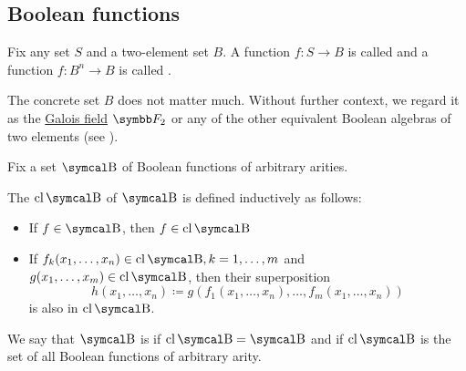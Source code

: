\subsection{Boolean functions}\label{subsec:boolean_functions}

\begin{definition}\label{def:boolean_function}
  Fix any set \( S \) and a two-element set \( B \). A function \( f: S \to B \) is called  and a function \( f: B^n \to B \) is called .

  The concrete set \( B \) does not matter much. Without further context, we regard it as the \hyperref[thm:galois_field_existence]{Galois field} \( \BF_2 \) or any of the other equivalent Boolean algebras of two elements (see ).
\end{definition}

\begin{definition}\label{def:boolean_closure}
  Fix a set \( \CB \) of Boolean functions of arbitrary arities.

  The  \( \Cl{\CB} \) of \( \CB \) is defined inductively as follows:
  \begin{itemize}
    \item If \( f \in \CB \), then \( f \in \Cl{\CB} \)
    \item If \( f_k(x_1, \ldots, x_n) \in \Cl{\CB}, k = 1, \ldots, m \) and \( g(x_1, \ldots, x_m) \in \Cl{\CB} \), then their superposition
      \begin{equation*}
        h(x_1, \ldots, x_n) \coloneqq g(f_1(x_1, \ldots, x_n), \ldots, f_m(x_1, \ldots, x_n))
      \end{equation*}
      is also in \( \Cl{\CB} \).
  \end{itemize}

  We say that \( \CB \) is  if \( \Cl{\CB} = \CB \) and  if \( \Cl{\CB} \) is the set of all Boolean functions of arbitrary arity.
\end{definition}

